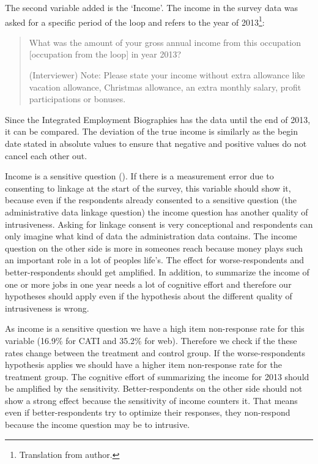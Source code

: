 The second variable added is the `Income'. The income in the survey data was asked for a specific period of the loop and refers to the year of 2013\footnote{Translation from author.}:


\begin{quote}
\begin {small}

What was the amount of your gross annual income from this occupation [occupation from the loop] in year 2013?

(Interviewer) Note: Please state your income without extra allowance like vacation allowance, Christmas allowance, an extra monthly salary, profit participations or bonuses.

\end{small}
\end{quote}


Since the Integrated Employment Biographies has the data until the end of 2013, it can be compared. The deviation of the true income is similarly as the begin date stated in absolute values to ensure that negative and positive values do not cancel each other out.

Income is a sensitive question (\cite{Tourangeauetal07}). If there is a measurement error due to consenting to linkage at the start of the survey, this variable should show it, because even if the respondents already consented to a sensitive question (the administrative data linkage question) the income question has another quality of intrusiveness. Asking for linkage consent is very conceptional and respondents can only imagine what kind of data the administration data contains. The income question on the other side is more in someones reach because money plays such an important role in a lot of peoples life's. The effect for worse-respondents and better-respondents should get amplified. In addition, to summarize the income of one or more jobs in one year needs a lot of cognitive effort and therefore our hypotheses should apply even if the hypothesis about the different quality of intrusiveness is wrong.

As income is a sensitive question we have a high item non-response rate for this variable (16.9\% for CATI and 35.2\% for web). Therefore we check if the these rates change between the treatment and control group. If the worse-respondents hypothesis applies we should have a higher item non-response rate for the treatment group. The cognitive effort of summarizing the income for 2013 should be amplified by the sensitivity. Better-respondents on the other side should not show a strong effect because the sensitivity of income counters it. That means even if better-respondents try to optimize their responses, they non-respond because the income question may be to intrusive.

